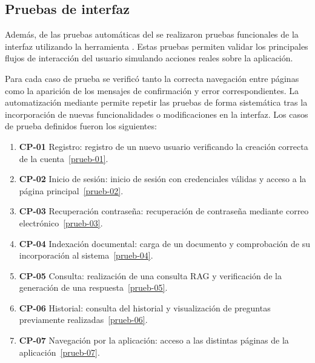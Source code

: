 \subsection{Pruebas de interfaz}

Además, de las pruebas automáticas del  se realizaron pruebas funcionales de la interfaz  utilizando la herramienta . Estas pruebas permiten validar los principales flujos de interacción del usuario simulando acciones reales sobre la aplicación.

Para cada caso de prueba se verificó tanto la correcta navegación entre páginas como la aparición de los mensajes de confirmación y error correspondientes. La automatización mediante  permite repetir las pruebas de forma sistemática tras la incorporación de nuevas funcionalidades o modificaciones en la interfaz. Los casos de prueba definidos fueron los siguientes:
\begin{enumerate}
\tightlist
	\item \textbf{CP-01} Registro: registro de un nuevo usuario verificando la creación correcta de la cuenta~\ref{prueb-01}. 
	\item \textbf{CP-02} Inicio de sesión: inicio de sesión con credenciales válidas y acceso a la página principal~\ref{prueb-02}.
	\item \textbf{CP-03} Recuperación contraseña: recuperación de contraseña mediante correo electrónico~\ref{prueb-03}.
	\item \textbf{CP-04} Indexación documental: carga de un documento y comprobación de su incorporación al sistema~\ref{prueb-04}.
	\item \textbf{CP-05} Consulta: realización de una consulta RAG y verificación de la generación de una respuesta~\ref{prueb-05}.
	\item \textbf{CP-06} Historial: consulta del historial y visualización de preguntas previamente realizadas~\ref{prueb-06}.
	\item \textbf{CP-07} Navegación por la aplicación: acceso a las distintas páginas de la aplicación~\ref{prueb-07}.
\end{enumerate}


